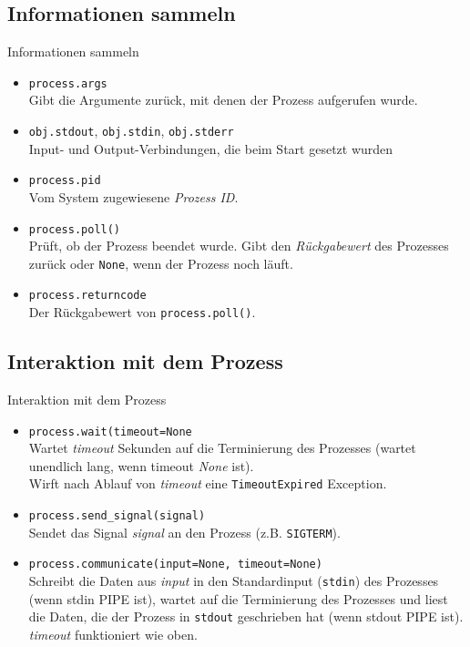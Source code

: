 \subsection{Informationen sammeln}
\begin{frame}[fragile]{Informationen sammeln}
	\begin{itemize}
		\item \texttt{process.args} \\
			Gibt die Argumente zur\"uck, mit denen der Prozess aufgerufen wurde.
		\item \texttt{obj.stdout}, \texttt{obj.stdin}, \texttt{obj.stderr} \\
			Input- und Output-Verbindungen, die beim Start gesetzt wurden
		\item \texttt{process.pid} \\
			Vom System zugewiesene \textit{Prozess ID}.
		\item \texttt{process.poll()} \\
			Pr\"uft, ob der Prozess beendet wurde. Gibt den \textit{R\"uckgabewert}
			des Prozesses zur\"uck oder \texttt{None}, wenn der Prozess noch l\"auft.
		\item \texttt{process.returncode} \\
			Der R\"uckgabewert von \texttt{process.poll()}.
	\end{itemize}
\end{frame}

\subsection{Interaktion mit dem Prozess}
\begin{frame}[fragile]{Interaktion mit dem Prozess}
	\begin{itemize}
		\item \texttt{process.wait(timeout=None} \\
			Wartet \textit{timeout} Sekunden auf die Terminierung des Prozesses
			(wartet unendlich lang, wenn timeout \textit{None} ist). \\
			Wirft nach Ablauf von \textit{timeout} eine \texttt{TimeoutExpired} Exception.
		\item \texttt{process.send\_signal(signal)} \\
			Sendet das Signal \textit{signal} an den Prozess (z.B. \texttt{SIGTERM}).
		\item \texttt{process.communicate(input=None, timeout=None)} \\
			Schreibt die Daten aus \textit{input} in den Standardinput (\texttt{stdin})
			des Prozesses (wenn stdin PIPE ist), wartet auf die Terminierung
			des Prozesses und liest die Daten, die der Prozess in \texttt{stdout}
			geschrieben hat (wenn stdout PIPE ist). \textit{timeout} funktioniert wie oben.
	\end{itemize}
\end{frame}

